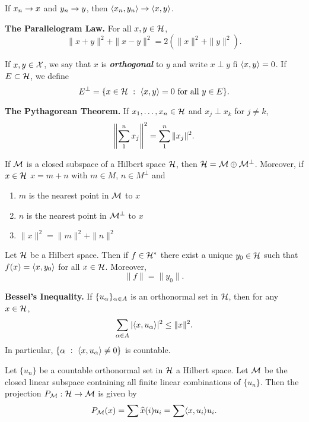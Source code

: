 \vs

\setcounter{thm}{20}

\begin{prop}
If $x_n\rightarrow x$ and $y_n \rightarrow y$, then $\langle x_n,y_n\rangle\rightarrow\langle x,y\rangle$.
\end{prop}

\vs

\textbf{The Parallelogram Law.} For all $x,y\in\mathcal{H}$,
\[\|x+y\|^2 + \|x-y\|^2 = 2(\|x\|^2 + \|y\|^2).\]

\vs

\dfn If $x,y\in \mathcal{X}$, we say that $x$ is \textbf{\textit{orthogonal}} to $y$ and write $x\perp y$ fi $\langle x,y\rangle = 0$. If $E\subset\mathcal{H}$, we define
\[E^\perp = \{x\in \mathcal{H}\ :\ \langle x,y\rangle = 0\text{ for all }y\in E\}.\]

\vs

\textbf{The Pythagorean Theorem.} If $x_1,\ldots,x_n\in \mathcal{H}$ and $x_j\perp x_k$ for $j\neq k$,
\[\left\| \sum_1^n x_j\right\|^2 = \sum_1^n\|x_j\|^2.\]

\vs

\setcounter{thm}{23}
\begin{thm}
If $\mathcal{M}$ is a closed subspace of a Hilbert space $\mathcal{H}$, then $\mathcal{H} = \mathcal{M}\oplus \mathcal{M}^\perp$. Moreover, if $x\in \mathcal{H}$ $x = m + n$ with $m\in M$, $n\in M^\perp$ and 
\begin{enumerate}
    \item $m$ is the nearest point in $\mathcal{M}$ to $x$
    \item $n$ is the nearest point in $\mathcal{M}^\perp$ to $x$
    \item $\|x\|^2 = \|m\|^2 + \|n\|^2$
\end{enumerate}
\end{thm}

\vs

\begin{thm}
Let $\mathcal{H}$ be a Hilbert space. Then if $f\in \mathcal{H}^*$ there exist a unique $y_0\in \mathcal{H}$ such that $f(x) = \langle x,y_0\rangle$ for all $x\in \mathcal{H}$. Moreover,
\[\|f\| = \|y_0\|.\]
\end{thm}

\vs

\textbf{Bessel's Inequality.} If $\{u_\alpha\}_{\alpha\in A}$ is an orthonormal set in $\mathcal{H}$, then for any $x\in \mathcal{H}$,
\[\sum_{\alpha\in A}|\langle x,u_\alpha\rangle|^2\leq \|x\|^2.\]
In particular, $\{\al\ :\ \ip{x}{u_\al} \neq 0\}$ is countable.

\vs

\dfn Let $\{u_n\}$ be a countable orthonormal set in $\mathcal{H}$ a Hilbert space. Let $\mathcal{M}$ be the closed linear subspace containing all finite linear combinations of $\{u_n\}$. Then the projection $P_{\mathcal{M}}:\mathcal{H}\rightarrow\mathcal{M}$ is given by
\[P_{\mathcal{M}}(x) = \sum\widehat x(i)u_i = \sum\langle x,u_i\rangle u_i.\]

